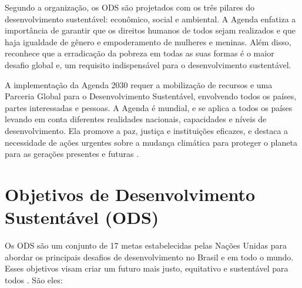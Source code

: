 Segundo a organização, os ODS são projetados com os três pilares do desenvolvimento sustentável: econômico, social e ambiental. A Agenda enfatiza a importância de garantir que os direitos humanos de todos sejam realizados e que haja igualdade de gênero e empoderamento de mulheres e meninas. Além disso, reconhece que a erradicação da pobreza em todas as suas formas é o maior desafio global e, um requisito indispensável para o desenvolvimento sustentável.

A implementação da Agenda 2030 requer a mobilização de recursos e uma Parceria Global para o Desenvolvimento Sustentável, envolvendo todos os países, partes interessadas e pessoas. A Agenda é mundial, e se aplica a todos os países levando em conta diferentes realidades nacionais, capacidades e níveis de desenvolvimento. Ela promove a paz, justiça e instituições eficazes, e destaca a necessidade de ações urgentes sobre a mudança climática para proteger o planeta para as gerações presentes e futuras \cite{onu2015agenda2030}.

\section{Objetivos de Desenvolvimento Sustentável (ODS)}

Os ODS são um conjunto de 17 metas estabelecidas pelas Nações Unidas para abordar os principais desafios de desenvolvimento no Brasil e em todo o mundo. Esses objetivos visam criar um futuro mais justo, equitativo e sustentável para todos \cite{onu2015ods}. São eles:


